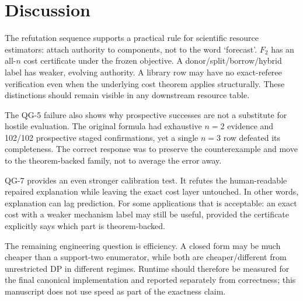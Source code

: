 \section{Discussion}

The refutation sequence supports a practical rule for scientific resource estimators: attach authority to components, not to the word `forecast'. $F_2$ has an all-$n$ cost certificate under the frozen objective. A donor/split/borrow/hybrid label has weaker, evolving authority. A library row may have no exact-referee verification even when the underlying cost theorem applies structurally. These distinctions should remain visible in any downstream resource table.

The QG-5 failure also shows why prospective successes are not a substitute for hostile evaluation. The original formula had exhaustive $n=2$ evidence and 102/102 prospective staged confirmations, yet a single $n=3$ row defeated its completeness. The correct response was to preserve the counterexample and move to the theorem-backed family, not to average the error away.

QG-7 provides an even stronger calibration test. It refutes the human-readable repaired explanation while leaving the exact cost layer untouched. In other words, explanation can lag prediction. For some applications that is acceptable: an exact cost with a weaker mechanism label may still be useful, provided the certificate explicitly says which part is theorem-backed.

The remaining engineering question is efficiency. A closed form may be much cheaper than a support-two enumerator, while both are cheaper/different from unrestricted DP in different regimes. Runtime should therefore be measured for the final canonical implementation and reported separately from correctness; this manuscript does not use speed as part of the exactness claim.